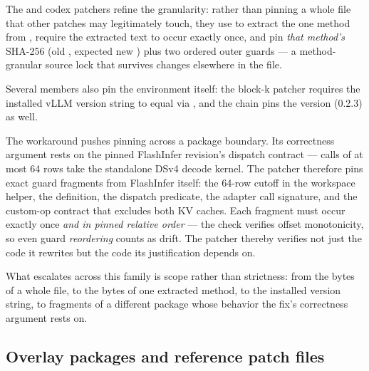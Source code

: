 The  and codex patchers refine the granularity: rather
than pinning a whole file that other patches may legitimately touch, they use
 to extract the one  method from
, require the extracted
text to occur exactly once, and pin \emph{that method's} SHA-256 (old
, expected new ) plus two ordered
outer guards --- a method-granular source lock that survives changes elsewhere
in the file.

Several members also pin the environment itself: the block-k patcher
requires the installed vLLM version string to equal
 via , and
the  chain pins the  version (0.2.3) as
well.

The  workaround pushes pinning across a package
boundary. Its correctness argument rests on the pinned FlashInfer revision's
dispatch contract --- calls of at most 64 rows take the standalone DSv4
decode kernel. The patcher therefore pins exact guard fragments from FlashInfer
itself: the 64-row cutoff in the workspace helper, the
 definition, the dispatch predicate, the
adapter call signature, and the custom-op  contract that
excludes both KV caches. Each fragment must occur exactly once \emph{and in
pinned relative order} --- the check verifies offset monotonicity, so even
guard \emph{reordering} counts as drift. The patcher thereby verifies not
just the code it rewrites but the code its justification depends on.

What escalates across this family is scope rather than strictness: from the
bytes of a whole file, to the bytes of one extracted method, to the installed
version string, to fragments of a different package whose behavior the fix's
correctness argument rests on.

\subsection{Overlay packages and reference patch files}

